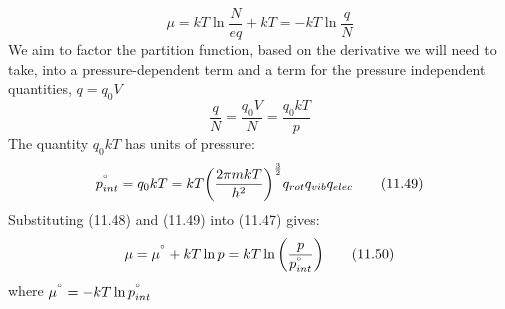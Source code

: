 \documentclass[8pt]{article}
\numberwithin{equation}{section}
\begin{document}
\begin{multicols}{2}
\begin{equation}
\mu=kT\ln{\frac{N}{eq}}+kT=-kT\ln{\frac{q}{N}} \tag{11.47}
\end{equation}
We aim to factor the partition function, based on the derivative we will need to take, into a pressure-dependent term and a term for the pressure independent quantities, $q=q_{0}V$
\begin{equation}
\frac{q}{N}=\frac{q_{0}V}{N}=\frac{q_{0}kT}{p} \tag{11.48}
\end{equation}
The quantity $q_{0}kT$ has units of pressure: 
\begin{equation}
p_{int}^{\degree}=q_{0}kT=kT\bigg(\frac{2\pi mkT}{h^{2}}\bigg)^{\frac{3}{2}}q_{rot}q_{vib}q_{elec} \tag{11.49}
\end{equation}
Substituting (11.48) and (11.49) into (11.47) gives: 
\begin{equation}
\mu=\mu^{\degree}+kT\ln{p}=kT\ln{\bigg(\frac{p}{p_{int}^{\degree}}\bigg)} \tag{11.50}
\end{equation}
where $\mu^{\degree}=-kT\ln{p_{int}^{\degree}}$
\setcounter{section}{12}

\end{multicols}
\end{document}
